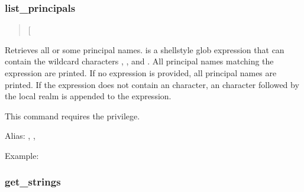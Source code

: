 \documentclass[letterpaper,10pt,english]{sphinxmanual}
\begin{document}
\subsubsection{list\_principals}
\label{\detokenize{admin/admin_commands/kadmin_local:list-principals}}\label{\detokenize{admin/admin_commands/kadmin_local:id9}}\begin{quote}

\sphinxAtStartPar
{} {[}\sphinxstyleemphasis{expression}{]}
\end{quote}

\sphinxAtStartPar
Retrieves all or some principal names.   is a shell\sphinxhyphen{}style
glob expression that can contain the wild\sphinxhyphen{}card characters ,
\sphinxcode{\sphinxupquote{*}}, and \sphinxcode{\sphinxupquote{{[}{]}}}.  All principal names matching the expression are
printed.  If no expression is provided, all principal names are
printed.  If the expression does not contain an  character, an
 character followed by the local realm is appended to the
expression.

\sphinxAtStartPar
This command requires the  privilege.

\sphinxAtStartPar
Alias: , , 

\sphinxAtStartPar
Example:

\begin{sphinxVerbatim}[commandchars=\\\{\}]
   
\end{sphinxVerbatim}


\subsubsection{get\_strings}
\label{\detokenize{admin/admin_commands/kadmin_local:get-strings}}\label{\detokenize{admin/admin_commands/kadmin_local:id10}}\begin{quote}

\sphinxAtStartPar
{} 
\end{quote}
\end{document}
